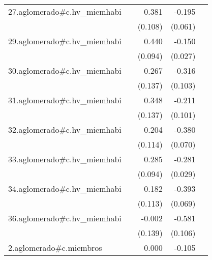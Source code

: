 {\begin{longtable}{l*{4}{D{.}{.}{-1}}}
\addlinespace
27.aglomerado#c.hv\_miemhabi&                     &       0.381\sym{***}&      -0.195\sym{**} &                     \\
            &                     &     (0.108)         &     (0.061)         &                     \\
\addlinespace
29.aglomerado#c.hv\_miemhabi&                     &       0.440\sym{***}&      -0.150\sym{***}&                     \\
            &                     &     (0.094)         &     (0.027)         &                     \\
\addlinespace
30.aglomerado#c.hv\_miemhabi&                     &       0.267         &      -0.316\sym{**} &                     \\
            &                     &     (0.137)         &     (0.103)         &                     \\
\addlinespace
31.aglomerado#c.hv\_miemhabi&                     &       0.348\sym{*}  &      -0.211\sym{*}  &                     \\
            &                     &     (0.137)         &     (0.101)         &                     \\
\addlinespace
32.aglomerado#c.hv\_miemhabi&                     &       0.204         &      -0.380\sym{***}&                     \\
            &                     &     (0.114)         &     (0.070)         &                     \\
\addlinespace
33.aglomerado#c.hv\_miemhabi&                     &       0.285\sym{**} &      -0.281\sym{***}&                     \\
            &                     &     (0.094)         &     (0.029)         &                     \\
\addlinespace
34.aglomerado#c.hv\_miemhabi&                     &       0.182         &      -0.393\sym{***}&                     \\
            &                     &     (0.113)         &     (0.069)         &                     \\
\addlinespace
36.aglomerado#c.hv\_miemhabi&                     &      -0.002         &      -0.581\sym{***}&                     \\
            &                     &     (0.139)         &     (0.106)         &                     \\
\addlinespace
2.aglomerado#c.miembros&                     &       0.000         &      -0.105\sym{***}&                     \\

\end{longtable}}

